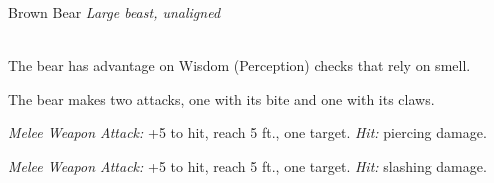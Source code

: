 \documentclass[10pt,twoside,twocolumn,openany]{book}
\begin{document}
\begin{monsterboxnobg}{Brown Bear}
	\textit{Large beast, unaligned}\\
	\hline
	\basics[
		armorclass	= 11 (natural armor),
		hitpoints		= \dice{4d10 + 12},
		speed		= {40 ft., climb 30 ft.}
	]
	\hline
	\stats[
		STR	= \stat{19},
		DEX	= \stat{10},
		CON	= \stat{16},
		INT	= \stat{2},
		WIS	= \stat{13},
		CHA	= \stat{7}
	]
	\hline
	\details[
		skills			= {Perception +3},
		senses		= {passive Perception 13},
		languages		= {-},
		challenge		= 1
	]
	\hline \\[1mm]
	\begin{monsteraction}
		The bear has advantage on Wisdom (Perception) checks that rely on smell.
	\end{monsteraction}
	\begin{monsteraction}[Multiattack]
		The bear makes two attacks, one with its bite and one with its claws.
	\end{monsteraction}
	
	\begin{monsteraction}[Bite]
		\textit{Melee Weapon Attack:} +5 to hit, reach 5 ft., one target. \textit{Hit:}  piercing damage.
	\end{monsteraction}
	
	\begin{monsteraction}[Claws]
		\textit{Melee Weapon Attack:} +5 to hit, reach 5 ft., one target. \textit{Hit:}  slashing damage.
	\end{monsteraction}	
\end{monsterboxnobg}
\end{document}

